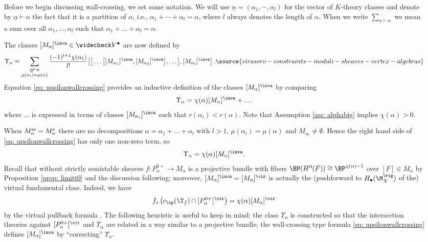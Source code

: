 Before we begin discussing wall-crossing, we set some notation. We will use $\underline{\alpha} = (\alpha_1,\cdots,\alpha_l)$ for the vector of $K$-theory classes and denote by $\underline{\alpha}\vdash \alpha$ the fact that it is a partition of $\alpha$, i.e., $\alpha_1+\cdots +\alpha_l = \alpha$, where $l$ always denotes the length of $\alpha$. When we write $\sum_{\underline{\alpha}\vdash \alpha}$ we mean a sum over all $\alpha_1, \ldots, \alpha_l$ such that $\alpha_1+\ldots+ \alpha_l=\alpha$.

The classes $[M_\alpha]^\inva\in \widecheck V^\bullet$ are now defined by
\begin{equation}
\Upsilon_\alpha=\sum_{\substack{\underline{\alpha}\vdash \alpha\\\mu(\alpha_i)=\mu(\alpha)}}\frac{(-1)^{l+1}\chi(\alpha_1)}{l!}\big[\big[\ldots  \big[ [M_{\alpha_1}]^\inva,[M_{\alpha_2}]^\inva \big],\ldots \big ],[M_{\alpha_l}]^\inva \big]\label{eq: upsilonwallcrossing}\,.
\source{virasoro-constraints-moduli-sheaves-vertex-algebras}
\end{equation}
Equation \eqref{eq: upsilonwallcrossing} provides an inductive definition of the classes $[M_{\alpha}]^\inva$ by comparing
\[\Upsilon_\alpha=\chi(\alpha)[M_\alpha]^\inva+\ldots\]
where $\ldots$ is expressed in terms of classes $[M_{\alpha_i}]^\inva$ such that $r(\alpha_i)<r(\alpha).$ Note that Assumption \ref{ass: alphabig} implies $\chi(\alpha)>0$.


\begin{remark}
\notready\label{rem: projectivebundle}
When $M_\alpha^{\textup{ss}}=M_\alpha^{\textup{s}}$ there are no decompositions $\alpha=\alpha_1+\ldots+\alpha_l$ with $l>1$, $\mu(\alpha_i)=\mu(\alpha)$ and $M_{\alpha_i}\neq \emptyset$. Hence the right hand side of \eqref{eq: upsilonwallcrossing} has only one non-zero term, so
\[\Upsilon_\alpha=\chi(\alpha)[M_\alpha]^\inva. \]
Recall that without strictly semistable sheaves $f\colon P_\alpha^{0+}\to M_\alpha$ is a projective bundle with fibers $\BP(H^0(F))\cong \BP^{\chi(\alpha)-1}$ over $[F]\in M_\alpha$ by Proposition \ref{prop: limitt0} and the discussion following; moreover, $[M_\alpha]^\inva=[M_\alpha]^\vir$ is actually the (pushforward to $H_\bullet(\M_X^\rig)$ of the) virtual fundamental class. Indeed, we have
\[f_\ast\left(c_\tp(\T_f)\cap [P_\alpha^{0+}]^\vir\right)=\chi(\alpha)[M_\alpha]^\vir\]
by the virtual pullback formula \cite[Theorem 4.7]{manolache}.
The following heuristic is useful to keep in mind: the class $\Upsilon_\alpha$ is constructed so that the intersection theories against $[P_\alpha^{0+}]^\vir$ and $\Upsilon_\alpha$ are related in a way similar to a projective bundle; the wall-crossing type formula \eqref{eq: upsilonwallcrossing} defines $[M_\alpha]^\inva$ by ``correcting'' $\Upsilon_\alpha$.
\end{remark}

